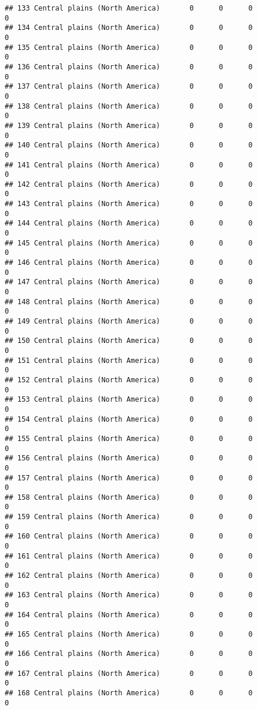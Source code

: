 \documentclass[]{article}
\begin{document}
\begin{verbatim}
## 133 Central plains (North America)       0      0      0             0
## 134 Central plains (North America)       0      0      0             0
## 135 Central plains (North America)       0      0      0             0
## 136 Central plains (North America)       0      0      0             0
## 137 Central plains (North America)       0      0      0             0
## 138 Central plains (North America)       0      0      0             0
## 139 Central plains (North America)       0      0      0             0
## 140 Central plains (North America)       0      0      0             0
## 141 Central plains (North America)       0      0      0             0
## 142 Central plains (North America)       0      0      0             0
## 143 Central plains (North America)       0      0      0             0
## 144 Central plains (North America)       0      0      0             0
## 145 Central plains (North America)       0      0      0             0
## 146 Central plains (North America)       0      0      0             0
## 147 Central plains (North America)       0      0      0             0
## 148 Central plains (North America)       0      0      0             0
## 149 Central plains (North America)       0      0      0             0
## 150 Central plains (North America)       0      0      0             0
## 151 Central plains (North America)       0      0      0             0
## 152 Central plains (North America)       0      0      0             0
## 153 Central plains (North America)       0      0      0             0
## 154 Central plains (North America)       0      0      0             0
## 155 Central plains (North America)       0      0      0             0
## 156 Central plains (North America)       0      0      0             0
## 157 Central plains (North America)       0      0      0             0
## 158 Central plains (North America)       0      0      0             0
## 159 Central plains (North America)       0      0      0             0
## 160 Central plains (North America)       0      0      0             0
## 161 Central plains (North America)       0      0      0             0
## 162 Central plains (North America)       0      0      0             0
## 163 Central plains (North America)       0      0      0             0
## 164 Central plains (North America)       0      0      0             0
## 165 Central plains (North America)       0      0      0             0
## 166 Central plains (North America)       0      0      0             0
## 167 Central plains (North America)       0      0      0             0
## 168 Central plains (North America)       0      0      0             0

\end{verbatim}
\end{document}
